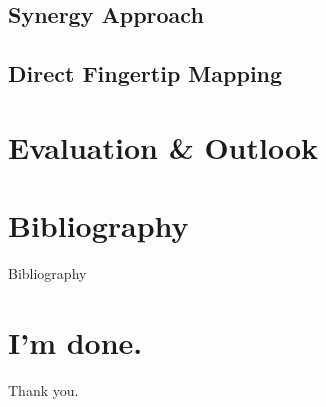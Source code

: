 \documentclass[t]{beamer}
\begin{document}
\subsection{Synergy Approach}
\subsection{Direct Fingertip Mapping}

\section{Evaluation \& Outlook}

\section{Bibliography}

\begin{frame}[allowframebreaks]{Bibliography}
\printbibliography
\end{frame}

\section*{I'm done.}

\begin{frame}[c]
\centering
Thank you.
\end{frame}
\end{document}
